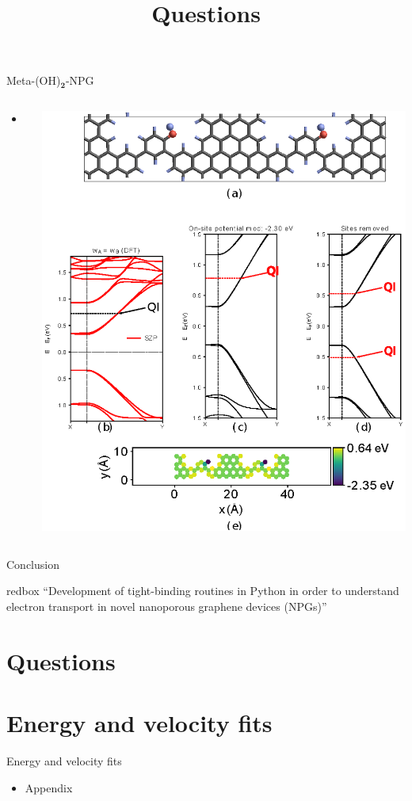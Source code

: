 \documentclass[hyperref={colorlinks=true,urlcolor=blue,linkcolor=.},aspectratio=1610,mathserif]{beamer}
\newcommand*\mathinhead[2]{\texorpdfstring{$\boldsymbol{#1}$}{#2}}
\begin{document}
\begin{frame}{Meta-(OH)\mathinhead{_2}{_2}-NPG}
\centering
\begin{columns}[c]
    \begin{itemize}
        \item 
    \end{itemize}
    \includegraphics[width=\textwidth]{Figures/fig22.eps}
\end{columns}
\end{frame}

\begin{frame}{Conclusion}
	\centering
	\begin{beamercolorbox}[sep=1em,wd=10cm]{redbox}
		``Development of tight-binding routines in Python in order to understand electron transport in novel nanoporous graphene devices (NPGs)''
	\end{beamercolorbox}
\end{frame}

\section*{Questions}
\title{Questions}
\subtitle{}
\begin{frame}
	\titlepage
\end{frame}

\appendix
\section{Energy and velocity fits}
\begin{frame}{Energy and velocity fits}
	\begin{itemize}
		\item Appendix
	\end{itemize}
\end{frame}
\end{document}
